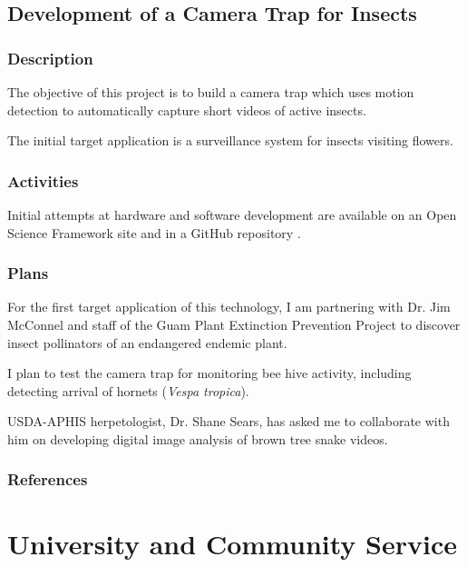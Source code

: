 \subsection{Development of a Camera Trap for Insects}
\begin{refsection}
\subsubsection{Description}

The objective of this project is to build a camera trap which uses motion detection to automatically capture short videos of active insects.

The initial target application is a surveillance system for insects visiting flowers.

\subsubsection{Activities}

Initial attempts at hardware and software development are available on an Open Science Framework site \cite{moore_development_2019} and in a GitHub repository \cite{moore_github_2019-2}.

\subsubsection{Plans}

For the first target application of this technology, I am partnering with Dr. Jim McConnel and staff of the Guam Plant Extinction Prevention Project to discover insect pollinators of an endangered endemic plant.

I plan to test the camera trap for monitoring bee hive activity, including detecting arrival of hornets (\textit{Vespa tropica}).

USDA-APHIS herpetologist, Dr. Shane Sears, has asked me to collaborate with him on developing digital image analysis of brown tree snake videos.

\subsubsection{References}
\printbibliography[heading=none]
\end{refsection}

\pagebreak
\section{University and Community Service}

